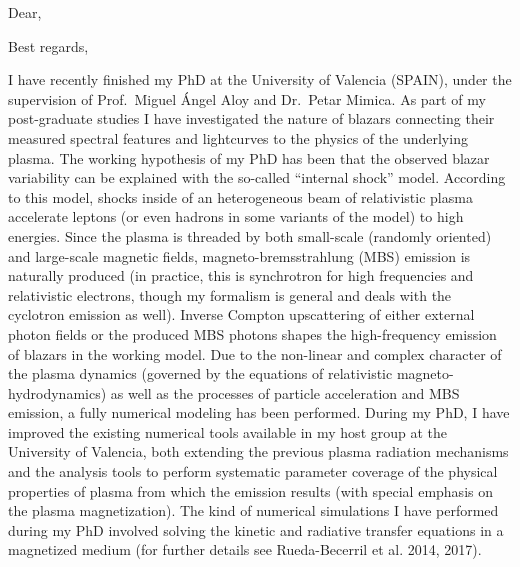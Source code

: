 \documentclass[11pt,a4paper,sans]{moderncv}        %
\begin{document}

%


\clearpage


\date{\today}
\opening{Dear,}
\closing{Best regards,}
%
\makelettertitle%
%

I have recently finished my PhD at the University of Valencia (SPAIN),
under the supervision of Prof.\ Miguel \'{A}ngel Aloy and Dr.\ Petar
Mimica. As part of my post-graduate studies I have investigated the nature
of blazars connecting their measured spectral features and lightcurves to
the physics of the underlying plasma. The working hypothesis of my PhD has
been that the observed blazar variability can be explained with the
so-called ``internal shock'' model. According to this model, shocks inside
of an heterogeneous beam of relativistic plasma accelerate leptons (or even
hadrons in some variants of the model) to high energies. Since the plasma
is threaded by both small-scale (randomly oriented) and large-scale
magnetic fields, magneto-bremsstrahlung (MBS) emission is naturally
produced (in practice, this is synchrotron for high frequencies and
relativistic electrons, though my formalism is general and deals with the
cyclotron emission as well). Inverse Compton upscattering of either
external photon fields or the produced MBS photons shapes the
high-frequency emission of blazars in the working model. Due to the
non-linear and complex character of the plasma dynamics (governed by the
equations of relativistic magneto-hydrodynamics) as well as the processes
of particle acceleration and MBS emission, a fully numerical modeling has
been performed. During my PhD, I have improved the existing numerical tools
available in my host group at the University of Valencia, both extending
the previous plasma radiation mechanisms and the analysis tools to perform
systematic parameter coverage of the physical properties of plasma from
which the emission results (with special emphasis on the plasma
magnetization). The kind of numerical simulations I have performed during
my PhD involved solving the kinetic and radiative transfer equations in a
magnetized medium (for further details see Rueda-Becerril et al. 2014,
2017).
\end{document}
